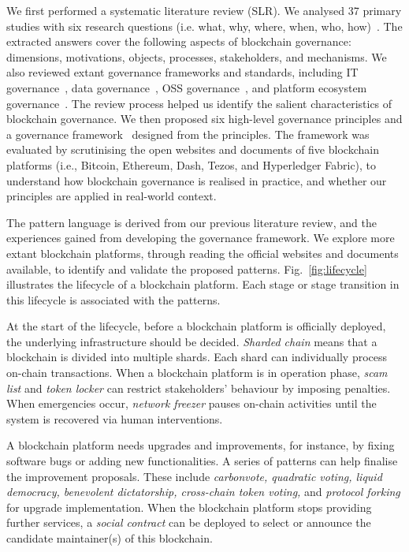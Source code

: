 \documentclass{article}
\begin{document}
We first performed a systematic literature review (SLR). We analysed 37 primary studies with six research questions (i.e. what, why, where, when, who, how)~\cite{liu2021systematic}. The extracted answers cover the following aspects of blockchain governance: dimensions, motivations, objects, processes, stakeholders, and mechanisms. We also reviewed extant governance frameworks and standards, including IT governance~\cite{weill2004governance, cobit2012business}, data governance~\cite{ballard2014ibm, ISO38505}, OSS governance~\cite{o2007emergence, de2007governance}, and platform ecosystem governance~\cite{tiwana2010platform}. The review process helped us identify the salient characteristics of blockchain governance. We then proposed six high-level governance principles and a governance framework~\cite{liu2021defining} designed from the principles. The framework was evaluated by scrutinising the open websites and documents of five blockchain platforms (i.e., Bitcoin, Ethereum, Dash, Tezos, and Hyperledger Fabric), to understand how blockchain governance is realised in practice, and whether our principles are applied in real-world context.

The pattern language is derived from our previous literature review, and the experiences gained from developing the governance framework. We explore more extant blockchain platforms, through reading the official websites and documents available, to identify and validate the proposed patterns. Fig.~\ref{fig:lifecycle} illustrates the lifecycle of a blockchain platform. Each stage or stage transition in this lifecycle is associated with the patterns.

At the start of the lifecycle, before a blockchain platform is officially deployed, the underlying infrastructure should be decided. \textit{Sharded chain} means that a blockchain is divided into multiple shards. Each shard can individually process on-chain transactions. When a blockchain platform is in operation phase, \textit{scam list} and \textit{token locker} can restrict stakeholders' behaviour by imposing penalties. When emergencies occur, \textit{network freezer} pauses on-chain activities until the system is recovered via human interventions.

A blockchain platform needs upgrades and improvements, for instance, by fixing software bugs or adding new functionalities. A series of patterns can help finalise the improvement proposals. These include \textit{carbonvote, quadratic voting, liquid democracy, benevolent dictatorship, cross-chain token voting,} and \textit{protocol forking} for upgrade implementation. When the blockchain platform stops providing further services, a \textit{social contract} can be deployed to select or announce the candidate maintainer(s) of this blockchain.
\end{document}
